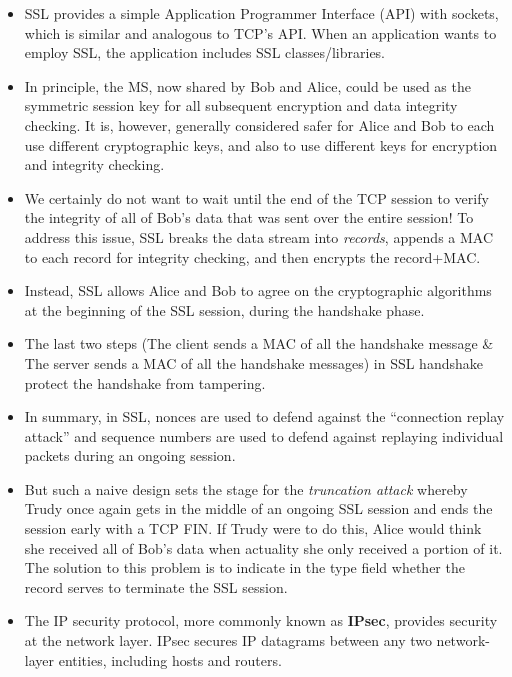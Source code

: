 \begin{itemize}
\item
SSL provides a simple Application Programmer Interface (API) with sockets, which is similar and analogous to TCP's API. When an application wants to employ SSL, the application includes SSL classes/libraries.

\item
In principle, the MS, now shared by Bob and Alice, could be used as the symmetric session key for all subsequent encryption and data integrity checking. It is, however, generally considered safer for Alice and Bob to each use different cryptographic keys, and also to use different keys for encryption and integrity checking.

\item
We certainly do not want to wait until the end of the TCP session to verify the integrity of all of Bob's data that was sent over the entire session! To address this issue, SSL breaks the data stream into \textit{records}, appends a MAC to each record for integrity checking, and then encrypts the record+MAC.

\item
Instead, SSL allows Alice and Bob to agree on the cryptographic algorithms at the beginning of the SSL session, during the handshake phase.

\item
The last two steps (The client sends a MAC of all the handshake message \& The server sends a MAC of all the handshake messages) in SSL handshake protect the handshake from tampering.

\item
In summary, in SSL, nonces are used to defend against the ``connection replay attack'' and sequence numbers are used to defend against replaying individual packets during an ongoing session.

\item
But such a naive design sets the stage for the \textit{truncation attack} whereby Trudy once again gets in the middle of an ongoing SSL session and ends the session early with a TCP FIN. If Trudy were to do this, Alice would think she received all of Bob's data when actuality she only received a portion of it. The solution to this problem is to indicate in the type field whether the record serves to terminate the SSL session.

\item
The IP security protocol, more commonly known as \textbf{IPsec}, provides security at the network layer. IPsec secures IP datagrams between any two network-layer entities, including hosts and routers.


\end{itemize}
